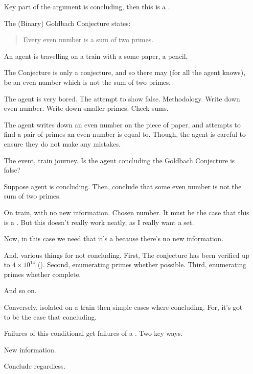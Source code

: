 \begin{note}
  Key part of the argument is concluding, then this is a \fc{}.

  \begin{scenario}%
    The (Binary) Goldbach Conjecture states:

    \begin{quote}
      Every even number is a sum of two primes.
    \end{quote}

    An agent is travelling on a train with a some paper, a pencil.

    The Conjecture is only a conjecture, and so there may (for all the agent knows), be an even number which is not the sum of two primes.

    The agent is very bored.
    The attempt to show false.
    Methodology.
    Write down even number.
    Write down smaller primes.
    Check sums.

    The agent writes down an even number on the piece of paper, and attempts to find a pair of primes an even number is equal to.
    Though, the agent is careful to ensure they do not make any mistakes.
  \end{scenario}

  The event, train journey.
  Is the agent concluding the Goldbach Conjecture is false?

  Suppose agent is concluding.
  Then, conclude that some even number is not the sum of two primes.

  On train, with no new information.
  Chosen number.
  It must be the case that this is a \fc{}.
  But this doesn't really work neatly, as I really want a set.
  

  Now, in this case we need that it's a \fc{} because there's no new information.

  And, various things for not concluding.
  First, The conjecture has been verified up to \(4 \times 10^{14}\) (\cite[cf.][]{Richstein:2001aa}).
  Second, enumerating primes whether possible.
  Third, enumerating primes whether complete.

  And so on.

  Conversely, isolated on a train then simple cases where concluding.
  For, it's got to be the case that concluding.


  Failures of this conditional get failures of a \requ{}.
  Two key ways.

  New information.

  Conclude regardless.
\end{note}


